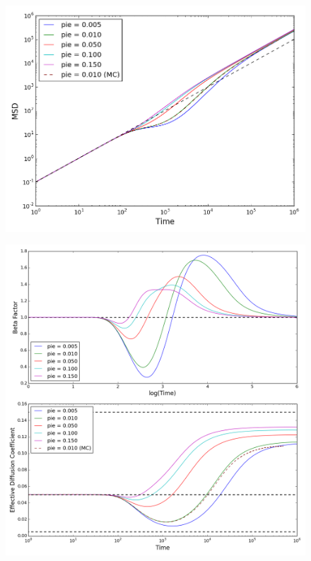 	\begin{figure}[h]
		\centering
		\includegraphics[width=1.0\linewidth]{../images/2D/pie_msd_2D}
		\caption{}
		\label{fig:pie_msd_2D}
	\end{figure}
	
	\begin{figure}[h]
		\centering
		\includegraphics[width=1.0\linewidth]{../images/2D/pie_beta_deff_2D}
		\caption{}
		\label{fig:pie_beta_deff_2D}
	\end{figure}
	
